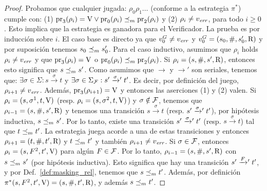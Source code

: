 \begin{proof}
	Probamos que cualquier jugada: $\rho_0 \rho_1 \dots$ (conforme a la estrategia $\pi^*$) cumple con: 
	(1) $\operatorname{pr}_{3}(\rho_i)=\mathrm{V} \vee \operatorname{pr}_{0}(\rho_i) \preceq_{m} \operatorname{pr}_{2}(\rho_i)$ y 
	(2) $\rho_i \neq v_{\mathit{err}}$, para todo $i\geq 0$. Esto implica que la estrategia es ganadora para el Verificador. 
La prueba es por inducción sobre $i$. El caso base es directo ya que 
$v_0^G \neq v_{\mathit{err}}$ y $v_0^G = (s_0, \#, s'_0, \mathrm{R})$ y por suposición tenemos $s_0 \preceq_{m} s'_0$. Para el caso inductivo, asumimos que 
$\rho_i$ holds $\rho_i \neq v_{\mathit{err}}$ y que $\operatorname{pr}_{3}(\rho_i) = \mathrm{V}$ o $\operatorname{pr}_{0}(\rho_i) \preceq_{m} \operatorname{pr}_{2}(\rho_i)$. 
Si $\rho_i = (s, \#, s', \mathrm{R})$, entonces esto significa que $s \preceq_{m} s'$. Como asumimos que
$\rightarrow$ y $\rightarrow'$ son seriales, tenemos que: $\exists \sigma \in \Sigma: s \xrightarrow{\sigma} t$ y $\exists \sigma \in \Sigma_{\mathcal{F}} : s' \mathrel{{\xrightarrow[]{\sigma}}{}'} t'$. Es decir, por definición del juego, $\rho_{i+1} \neq v_{\mathit{err}}$. 
Además, $\operatorname{pr}_{3}(\rho_{i+1}) = \mathrm{V}$ y entonces las aserciones (1) y (2) valen. 
Si $\rho_i = (s, \sigma^1, t, \mathrm{V})$ (resp. $\rho_i = (s, \sigma^2, t, \mathrm{V})$) y $\sigma \notin \mathcal{F}$,
tenemos que $\rho_{i-1} = (s, \#, s', \mathrm{R})$ y tenemos una transición $s \xrightarrow{\sigma} t$ (resp. $s' \mathrel{{\xrightarrow[]{\sigma}}{}'} t'$), por hipótesis inductiva, $s \preceq_{m} s'$. 
Por lo tanto, existe una transición $s' \mathrel{{\xrightarrow[]{\sigma}}{}'} t'$ (resp.  $s \xrightarrow{\sigma} t$) tal que $t \preceq_{m} t'$. 
La estrategia juega acorde a una de estas transiciones y entonces
$\rho_{i+1} = (t, \#, t', \mathrm{R})$ y $t \preceq_{m} t'$ y también $\rho_{i+1} \neq v_{\mathit{err}}$. Si $\sigma \in \mathcal{F}$, entonces $\rho_i = (s, F^2, t', \mathrm{V})$ para algún $F \in \mathcal{F}$. 
Por lo tanto, $\rho_{i-1} = (s, \#, s', \mathrm{R})$ con $s \preceq_{m} s'$ (por hipótesis inductiva). Esto significa que hay una transición $s' \mathrel{{\xrightarrow[]{F}}{}'} t'$, y por Def.~\ref{def:masking_rel},
tenemos que $s \preceq_{m} t'$. Además, por definición $\pi^*(s, F^2, t', \mathrm{V}) = (s, \#,t',\mathrm{R})$, 
y además $s \preceq_{m} t'$. 


\end{proof}
